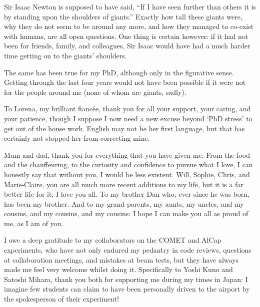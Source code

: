 \begin{acknowledgements}
Sir Isaac Newton is supposed to have said, ``If I have seen further than others it is by standing upon the shoulders of giants.''  
Exactly how tall these giants were, why they do not seem to be around any more, and how they managed to co-exist with humans, are all open questions.
One thing is certain however: if it had not been for friends, family, and colleagues, Sir Isaac would have had a much harder time getting on to the giants' shoulders.

The same has been true for my PhD, although only in the figurative sense.
Getting through the last four years would not have been possible if it were not for the people around me (none of whom are giants, sadly).

To Lorena, my brilliant fianc\'{e}e, thank you for all your support, your caring, and your patience, though I suppose I now need a new excuse beyond `PhD stress' to get out of the house work.
English may not be her first language, but that has certainly not stopped her from correcting mine.

Mum and dad, thank you for everything that you have given me. From the food and the chauffeuring, to the curiosity and confidence to pursue what I love, 
I can honestly say that without you, I would be less existent.
Will, Sophie, Chris, and Marie-Claire, you are all much more recent additions to my life, but it is a far better life for it; I love you all.
To my brother Dan who, ever since he was born, has been my brother.
And to my grand-parents, my aunts, my uncles, and my cousins, and my cousins, and my cousins:  I hope I can make you all as proud of me, as I am of you.

I owe a deep gratitude to my collaborators on the COMET and AlCap experiments, who have not only endured my pedantry in code reviews, questions at collaboration meetings, and mistakes at beam tests, but they have always made me feel very welcome whilst doing it. 
Specifically to Yoshi Kuno and Satoshi Mihara, thank you both for supporting me during my times in Japan:
I imagine few students can claim to have been personally driven to the airport by the spokesperson of their experiment!


\end{acknowledgements}
